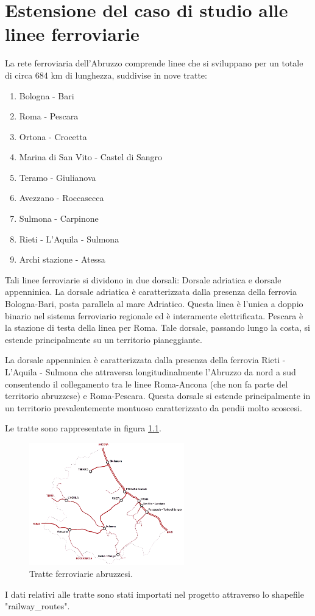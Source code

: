 
\chapter{Estensione del caso di studio alle linee ferroviarie} 

La rete ferroviaria dell'Abruzzo comprende linee che si sviluppano per un totale di circa 684 km di lunghezza, suddivise in nove tratte:

\begin{enumerate}
	\item Bologna - Bari
	\item Roma - Pescara
	\item Ortona - Crocetta
	\item Marina di San Vito - Castel di Sangro
	\item Teramo - Giulianova
	\item Avezzano - Roccasecca
	\item Sulmona - Carpinone
	\item Rieti - L'Aquila - Sulmona
	\item Archi stazione - Atessa
\end{enumerate}

Tali linee ferroviarie si dividono in due dorsali: Dorsale adriatica e dorsale appenninica.
La dorsale adriatica è caratterizzata dalla presenza della ferrovia Bologna-Bari, posta parallela al mare Adriatico. Questa linea è l'unica a doppio binario nel sistema ferroviario regionale ed è interamente elettrificata. Pescara è la stazione di testa della linea per Roma. Tale dorsale, passando lungo la costa, si estende principalmente su un territorio pianeggiante.  

La dorsale appenninica è caratterizzata dalla presenza della ferrovia Rieti - L'Aquila - Sulmona che attraversa longitudinalmente l'Abruzzo da nord a sud consentendo il collegamento tra le linee Roma-Ancona (che non fa parte del territorio abruzzese) e Roma-Pescara. Questa dorsale si estende principalmente in un territorio prevalentemente montuoso caratterizzato da pendii molto scoscesi.

Le tratte sono rappresentate in figura \ref{abruzzo_tratte}.

\begin{figure}[H]
	\centering
	\includegraphics[width=0.6\textwidth]{images/Mappa_ferrovie_abruzzesi}
	\caption{Tratte ferroviarie abruzzesi.}
	\label{abruzzo_tratte}
\end{figure}


I dati relativi alle tratte sono stati importati nel progetto attraverso lo shapefile "railway\_routes". 
